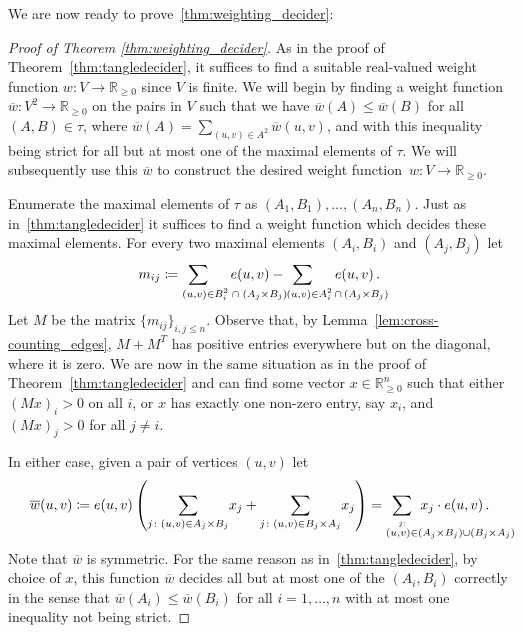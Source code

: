 \documentclass[11pt]{article}
\theoremstyle{definition}
\newcommand{\R}{\mathbb{R}}
\begin{document}
We are now ready to prove~\cref{thm:weighting_decider}:

\begin{proof}[Proof of Theorem \ref{thm:weighting_decider}]
As in the proof of Theorem~\ref{thm:tangledecider}, it suffices to find a suitable real-valued weight function $ w\colon V\to\R_{\ge 0} $ since $ V $ is finite. We will begin by finding a weight function $\overline{w}\colon V^2\to \R_{\ge 0}$ on the pairs in $ V $ such that we have $\overline{w}(A)\le \overline{w}(B) $ for all $ (A,B)\in \tau$, where $\overline{w}(A) = \sum_{(u,v) \in A^2} \overline{w}(u,v)$, and with this inequality being strict for all but at most one of the maximal elements of $ \tau $. We will subsequently use this $ \overline{w} $ to construct the desired weight function~$w\colon V\to \R_{\ge 0}$.

Enumerate the maximal elements of $\tau$ as $(A_1,B_1),\dots,(A_n,B_n)$. Just as in~\cref{thm:tangledecider} it suffices to find a weight function which decides these maximal elements. For every two maximal elements $(A_i,B_i)$ and $(A_j,B_j)$ let
\[ m_{ij}\coloneqq\sum_{(u,v)\in \mathrlap{B_i^2 \;\cap\; (A_j\times B_j)}} \quad e(u,v) - \sum_{(u,v)\in \mathrlap{A_i^2 \,\cap\, (A_j\times B_j)}}\quad e(u,v)\,. \]
Let $ M $ be the matrix $ \{m_{ij}\}_{i,j\le n} $. Observe that, by Lemma~\ref{lem:cross-counting_edges}, $M + M^T$ has positive entries everywhere but on the diagonal, where it is zero. We are now in the same situation as in the proof of Theorem~\ref{thm:tangledecider} and can find some vector $x\in\R_{\ge 0}^n$ such that either $(Mx)_i>0$ on all $i$, or $x$ has exactly one non-zero entry, say $x_i$, and $(Mx)_j>0$ for all $j\neq i$.

In either case, given a pair of vertices $(u,v)$ let 
\[\overline{w}(u,v)\coloneqq e(u,v)\left(\sum_{j\colon (u,v) \in A_j\times B_j }\!x_j+\sum_{j\colon (u,v)\in B_j\times A_j} \!x_j\right) = \sum_{\overset{j:}{(u,v) \in \mathrlap{(A_j\times B_j )\cup (B_j\times A_j)}}} x_j \cdot e(u,v)\,.\]
Note that $\overline{w}$ is symmetric. For the same reason as in~\cref{thm:tangledecider}, by choice of $ x $, this function $ \overline{w} $ decides all but at most one of the $ (A_i,B_i) $ correctly in the sense that $ \overline{w}(A_i)\le\overline{w}(B_i) $ for all $ i=1,\dots,n $ with at most one inequality not being strict.


\end{proof}
\end{document}
